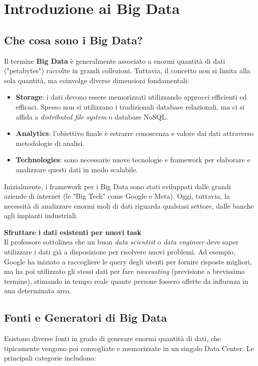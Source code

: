 \chapter{Introduzione ai Big Data}

\section{Che cosa sono i Big Data?}
Il termine \textbf{Big Data} è generalmente associato a enormi quantità di dati ("petabytes") raccolte in grandi collezioni. Tuttavia, il concetto non si limita alla sola quantità, ma coinvolge diverse dimensioni fondamentali:
\begin{itemize}
    \item \textbf{Storage}: i dati devono essere memorizzati utilizzando approcci efficienti ed efficaci. Spesso non si utilizzano i tradizionali database relazionali, ma ci si affida a \textit{distributed file system} o database NoSQL.
    \item \textbf{Analytics}: l'obiettivo finale è estrarre conoscenza e valore dai dati attraverso metodologie di analisi.
    \item \textbf{Technologies}: sono necessarie nuove tecnologie e framework per elaborare e analizzare questi dati in modo scalabile.
\end{itemize}

Inizialmente, i framework per i Big Data sono stati sviluppati dalle grandi aziende di internet (le "Big Tech" come Google e Meta). Oggi, tuttavia, la necessità di analizzare enormi moli di dati riguarda qualsiasi settore, dalle banche agli impianti industriali.

\begin{remark}
\textbf{Sfruttare i dati esistenti per nuovi task}\\
Il professore sottolinea che un buon \textit{data scientist} o \textit{data engineer} deve saper utilizzare i dati già a disposizione per risolvere nuovi problemi. Ad esempio, Google ha iniziato a raccogliere le query degli utenti per fornire risposte migliori, ma ha poi utilizzato gli stessi dati per fare \textit{nowcasting} (previsione a brevissimo termine), stimando in tempo reale quante persone fossero affette da influenza in una determinata area.
\end{remark}

\section{Fonti e Generatori di Big Data}
Esistono diverse fonti in grado di generare enormi quantità di dati, che tipicamente vengono poi convogliate e memorizzate in un singolo Data Center. Le principali categorie includono:

